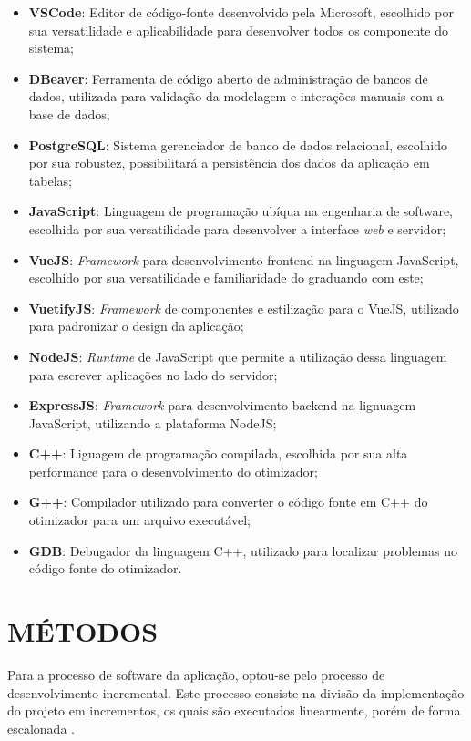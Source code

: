 \begin{itemize}
	\item \textbf{VSCode}: Editor de código-fonte desenvolvido pela Microsoft, escolhido por sua versatilidade e aplicabilidade para desenvolver todos os componente do sistema;
	\item \textbf{DBeaver}: Ferramenta de código aberto de administração de bancos de dados, utilizada para validação da modelagem e interações manuais com a base de dados;
	\item \textbf{PostgreSQL}: Sistema gerenciador de banco de dados relacional, escolhido por sua robustez, possibilitará a persistência dos dados da aplicação em tabelas;
	\item \textbf{JavaScript}: Linguagem de programação ubíqua na engenharia de software, escolhida por sua versatilidade para desenvolver a interface \textit{web} e servidor;
	\item \textbf{VueJS}: \textit{Framework} para desenvolvimento frontend na linguagem JavaScript, escolhido por sua versatilidade e familiaridade do graduando com este;
	\item \textbf{VuetifyJS}: \textit{Framework} de componentes e estilização para o VueJS, utilizado para padronizar o design da aplicação;
	\item \textbf{NodeJS}: \textit{Runtime} de JavaScript que permite a utilização dessa linguagem para escrever aplicações no lado do servidor;
	\item \textbf{ExpressJS}: \textit{Framework} para desenvolvimento backend na lignuagem JavaScript, utilizando a plataforma NodeJS;
	\item \textbf{C++}: Liguagem de programação compilada, escolhida por sua alta performance para o desenvolvimento do otimizador;
	\item \textbf{G++}: Compilador utilizado para converter o código fonte em C++ do otimizador para um arquivo executável;
	\item \textbf{GDB}: Debugador da linguagem C++, utilizado para localizar problemas no código fonte do otimizador.
\end{itemize}

\section{MÉTODOS}
\label{sec:metodos}

Para a processo de software da aplicação, optou-se pelo processo de desenvolvimento incremental. Este processo consiste na divisão da implementação do projeto em incrementos, os quais são executados linearmente, porém de forma escalonada \cite{pressman2016}.

